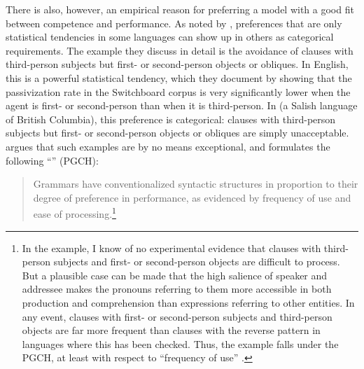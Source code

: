\documentclass[output=paper
                ,modfonts
                ,nonflat
	        ,collection
	        ,collectionchapter
	        ,collectiontoclongg
 	        ,biblatex
                ,babelshorthands
                ,newtxmath
                ,draftmode
                ,colorlinks, citecolor=brown
]{./langsci/langscibook}
\begin{document}
There is also, however, an empirical reason for preferring a model with a good fit between competence and performance.  As noted by \citet{BresnanEtAl2001}, preferences that are only statistical tendencies in some languages can show up in others as categorical requirements.  The example they discuss in detail is the avoidance of clauses with third-person subjects but first- or second-person objects or obliques. In English, this is a powerful statistical tendency, which they document by showing that the passivization rate in the Switchboard corpus is very significantly lower when the agent is first- or second-person than when it is third-person.  In  (a Salish language of British Columbia), this preference is categorical:  clauses with third-person subjects but first- or second-person objects or obliques are simply unacceptable.  \citet{Hawkins2004a-u,Hawkins2014} argues that such examples are by no means exceptional, and formulates the following ``'' (PGCH):
\begin{quote}
Grammars  have  conventionalized  syntactic  structures  in  proportion   to their degree of
preference in performance, as evidenced by frequency of use and ease of processing.\footnote{In the
  \citeauthor{BresnanEtAl2001} example, I know of no experimental evidence that clauses with
  third-person subjects and first- or second-person objects are difficult to process.  But a
  plausible case can be made that the high salience of speaker and addressee makes the pronouns
  referring to them more accessible in both production and comprehension than expressions referring
  to other entities.  In any event, clauses with first- or second-person subjects and third-person
  objects are far more frequent than clauses with the reverse pattern in languages where this has
  been checked.  Thus, the \citeauthor{BresnanEtAl2001} example falls under the PGCH, at least with
  respect to ``frequency of use'' .}
\end{quote}
\end{document}
